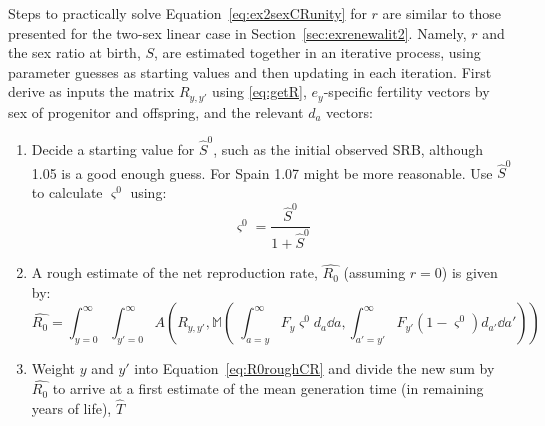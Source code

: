 
 \FloatBarrier
\label{sec:ex2sexCRit}
Steps to practically solve Equation~\eqref{eq:ex2sexCRunity} for $r$ are
similar to those presented for the two-sex linear case in
Section~\ref{sec:exrenewalit2}. Namely, $r$ and the sex ratio at birth, $S$, are
estimated together in an iterative process, using parameter guesses as starting
values and then updating in each iteration. First derive as inputs the matrix
$R_{y,y'}$ using \eqref{eq:getR}, $e_y$-specific fertility vectors by
sex of progenitor and offspring, and the relevant $d_a$ vectors:
\begin{enumerate}
  \item Decide a starting value for $\hat{S}^0$, such as the initial observed SRB,
although 1.05 is a good enough guess. For Spain 1.07 might be more
reasonable. Use $\hat{S}^0$ to calculate $\varsigma^0$ using:
\begin{equation}
\label{eq:getvarsigma}
\varsigma^0 = \frac{\hat{S}^0}{1+\hat{S}^0}
\end{equation}
  \item A rough estimate of the net reproduction rate, $\widehat{R_0}$ (assuming
  $r=0$) is given by:
 \begin{equation}
 \label{eq:R0roughCR}
 \widehat{R_0} = \int_{y=0}^\infty \int_{y'=0}^\infty
A\left(R_{y,y'},\mathbb{M}\left(\;\int_{a=y}^\infty F_y \varsigma^0 d_a \dd a,
\int _{a'=y'}^\infty F_{y'} (1-\varsigma^0) d_{a'} \dd a'\right)\right)
 \end{equation}
  \item Weight $y$ and $y'$ into Equation~\eqref{eq:R0roughCR} and divide the
  new sum by $\widehat{R_0}$ to arrive at a first estimate of the mean
  generation time (in remaining years of life), $\widehat{T}$


\end{enumerate}

